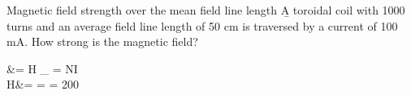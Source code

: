 \begin{frame} 
	\begin{expl}{Magnetic field strength over the mean field line length}{}
		\b{A toroidal coil with 1000 turns and an average field line length of 50 cm is traversed by a current of 100 mA. How strong is the magnetic field?}%
		\begin{eqa}
			\varTheta &= H \cdot \ell_{} = N\cdot I\nonumber\\
			\onslide<3->H&=
			\onslide<4->= = 200\,\nonumber
			\onslide<1->
		\end{eqa}
	\end{expl}


\end{frame}
